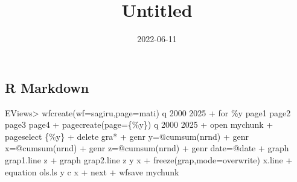 \documentclass[
]{article}
\title{Untitled}
\author{}
\date{\vspace{-2.5em}2022-06-11}
\newenvironment{Shaded}{\begin{snugshade}}{\end{snugshade}}
\newcommand{\NormalTok}[1]{#1}
\begin{document}
\maketitle

{
\setcounter{tocdepth}{2}
\tableofcontents
}
\hypertarget{r-markdown}{%
\subsection{R Markdown}\label{r-markdown}}

\begin{Shaded}
\begin{Highlighting}[]
\NormalTok{EViews\textgreater{} wfcreate(wf=sagiru,page=mati) q 2000 2025}
\NormalTok{+ for \%y page1 page2 page3 page4}
\NormalTok{+ pagecreate(page=\{\%y\}) q 2000 2025}
\NormalTok{+ \textquotesingle{}open mychunk}
\NormalTok{+ pageselect \{\%y\}}
\NormalTok{+ delete gra*}
\NormalTok{+ genr y=@cumsum(nrnd)}
\NormalTok{+ genr x=@cumsum(nrnd)}
\NormalTok{+ genr z=@cumsum(nrnd)}
\NormalTok{+ genr date=@date}
\NormalTok{+                      graph grap1.line z  }
\NormalTok{+                            graph grap2.line z y x}
\NormalTok{+    freeze(grap,mode=overwrite) x.line}
\NormalTok{+ equation ols.ls y c x}
\NormalTok{+ next}
\NormalTok{+ wfsave mychunk}
\end{Highlighting}
\end{Shaded}
\end{document}
